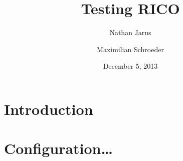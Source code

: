 \documentclass{article}
\title{Testing RICO}
\date{December 5, 2013}
\author{Nathan Jarus \and Maximilian Schroeder}
\begin{document}
\section{Introduction}
\section{Configuration\ldots}
\end{document}
